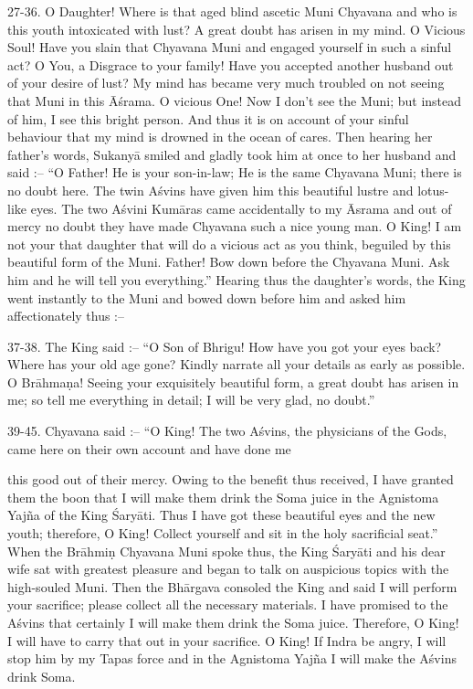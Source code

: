 27-36. O Daughter! Where is that aged blind ascetic Muni Chyavana and who is this youth intoxicated with lust? A great doubt has arisen in my mind. O Vicious Soul! Have you slain that Chyavana Muni and engaged yourself in such a sinful act? O You, a Disgrace to your family! Have you accepted another husband out of your desire of lust? My mind has became very much troubled on not seeing that Muni in this \=A\'srama. O vicious One! Now I don't see the Muni; but instead of him, I see this bright person. And thus it is on account of your sinful behaviour that my mind is drowned in the ocean of cares. Then hearing her father's words, Sukany\=a smiled and gladly took him at once to her husband and said :-- ``O Father! He is your son-in-law; He is the same Chyavana Muni; there is no doubt here. The twin A\'svins have given him this beautiful lustre and lotus-like eyes. The two A\'svini Kum\=aras came accidentally to my \=Asrama and out of mercy no doubt they have made Chyavana such a nice young man. O King! I am not your that daughter that will do a vicious act as you think, beguiled by this beautiful form of the Muni. Father! Bow down before the Chyavana Muni. Ask him and he will tell you everything.'' Hearing thus the daughter's words, the King went instantly to the Muni and bowed down before him and asked him affectionately thus :--

37-38. The King said :-- ``O Son of Bhrigu! How have you got your eyes back? Where has your old age gone? Kindly narrate all your details as early as possible. O Br\=ahma\d{n}a! Seeing your exquisitely beautiful form, a great doubt has arisen in me; so tell me everything in detail; I will be very glad, no doubt.''

39-45. Chyavana said :-- ``O King! The two A\'svins, the physicians of the Gods, came here on their own account and have done me

this good out of their mercy. Owing to the benefit thus received, I have granted them the boon that I will make them drink the Soma juice in the Agnistoma Yaj\~na of the King \'Sary\=ati. Thus I have got these beautiful eyes and the new youth; therefore, O King! Collect yourself and sit in the holy sacrificial seat.'' When the Br\=ahmi\d{n} Chyavana Muni spoke thus, the King \'Sary\=ati and his dear wife sat with greatest pleasure and began to talk on auspicious topics with the high-souled Muni. Then the Bh\=argava consoled the King and said I will perform your sacrifice; please collect all the necessary materials. I have promised to the A\'svins that certainly I will make them drink the Soma juice. Therefore, O King! I will have to carry that out in your sacrifice. O King! If Indra be angry, I will stop him by my Tapas force and in the Agnistoma Yaj\~na I will make the A\'svins drink Soma.

